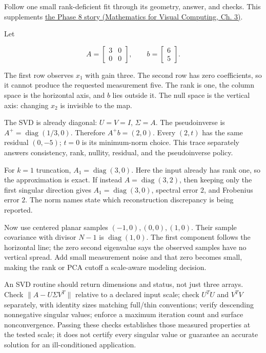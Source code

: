 Follow one small rank-deficient fit through its geometry, answer, and checks. This supplements \href{../02-Mathematics-for-Visual-Computing/main.pdf\#nameddest=01-foundations-i-ch019-the-graphics-problem-hiding-inside-a-matrix-equation}{the Phase 8 story (Mathematics for Visual Computing, Ch. 3)}.

Let

\[
A=\begin{bmatrix}3&0\\0&0\end{bmatrix},\qquad
b=\begin{bmatrix}6\\5\end{bmatrix}.
\]

The first row observes \(x_1\) with gain three. The second row has zero coefficients, so it cannot produce the requested measurement five. The rank is one, the column space is the horizontal axis, and \(b\) lies outside it. The null space is the vertical axis: changing \(x_2\) is invisible to the map.

The SVD is already diagonal: \(U=V=I\), \(\Sigma=A\). The pseudoinverse is \(A^+=\operatorname{diag}(1/3,0)\). Therefore \(A^+b=(2,0)\). Every \((2,t)\) has the same residual \((0,-5)\); \(t=0\) is its minimum-norm choice. This trace separately answers consistency, rank, nullity, residual, and the pseudoinverse policy.

For \(k=1\) truncation, \(A_1=\operatorname{diag}(3,0)\). Here the input already has rank one, so the approximation is exact. If instead \(A=\operatorname{diag}(3,2)\), then keeping only the first singular direction gives \(A_1=\operatorname{diag}(3,0)\), spectral error \(2\), and Frobenius error \(2\). The norm names state which reconstruction discrepancy is being reported.

Now use centered planar samples \((-1,0),(0,0),(1,0)\). Their sample covariance with divisor \(N-1\) is \(\operatorname{diag}(1,0)\). The first component follows the horizontal line; the zero second eigenvalue says the observed samples have no vertical spread. Add small measurement noise and that zero becomes small, making the rank or PCA cutoff a scale-aware modeling decision.

An SVD routine should return dimensions and status, not just three arrays. Check \(\|A-U\Sigma V^T\|\) relative to a declared input scale; check \(U^TU\) and \(V^TV\) separately, with identity sizes matching full/thin conventions; verify descending nonnegative singular values; enforce a maximum iteration count and surface nonconvergence. Passing these checks establishes those measured properties at the tested scale; it does not certify every singular value or guarantee an accurate solution for an ill-conditioned application.

